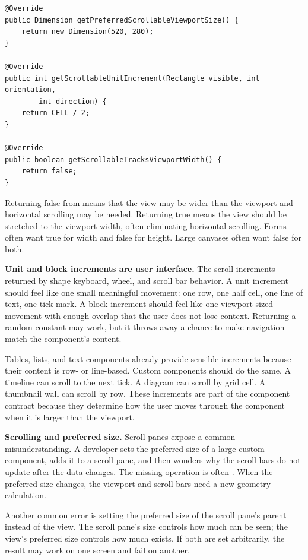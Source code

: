 \begin{lstlisting}[caption={The essential Scrollable methods for a large canvas.}]
@Override
public Dimension getPreferredScrollableViewportSize() {
    return new Dimension(520, 280);
}

@Override
public int getScrollableUnitIncrement(Rectangle visible, int orientation,
        int direction) {
    return CELL / 2;
}

@Override
public boolean getScrollableTracksViewportWidth() {
    return false;
}
\end{lstlisting}

Returning false from  means that the view may be wider than the viewport and horizontal scrolling may be needed. Returning true means the view should be stretched to the viewport width, often eliminating horizontal scrolling. Forms often want true for width and false for height. Large canvases often want false for both.

\textbf{Unit and block increments are user interface.} The scroll increments returned by  shape keyboard, wheel, and
scroll bar behavior. A unit increment should feel like one small meaningful
movement: one row, one half cell, one line of text, one tick mark. A block
increment should feel like one viewport-sized movement with enough overlap that
the user does not lose context. Returning a random constant may work, but it
throws away a chance to make navigation match the component's content.

Tables, lists, and text components already provide sensible increments because
their content is row- or line-based. Custom components should do the same. A
timeline can scroll to the next tick. A diagram can scroll by grid cell. A
thumbnail wall can scroll by row. These increments are part of the component
contract because they determine how the user moves through the component when
it is larger than the viewport.

\textbf{Scrolling and preferred size.} Scroll panes expose a common misunderstanding. A developer sets the preferred size of a large custom component, adds it to a scroll pane, and then wonders why the scroll bars do not update after the data changes. The missing operation is often . When the preferred size changes, the viewport and scroll bars need a new geometry calculation.

Another common error is setting the preferred size of the scroll pane's parent instead of the view. The scroll pane's size controls how much can be seen; the view's preferred size controls how much exists. If both are set arbitrarily, the result may work on one screen and fail on another.

